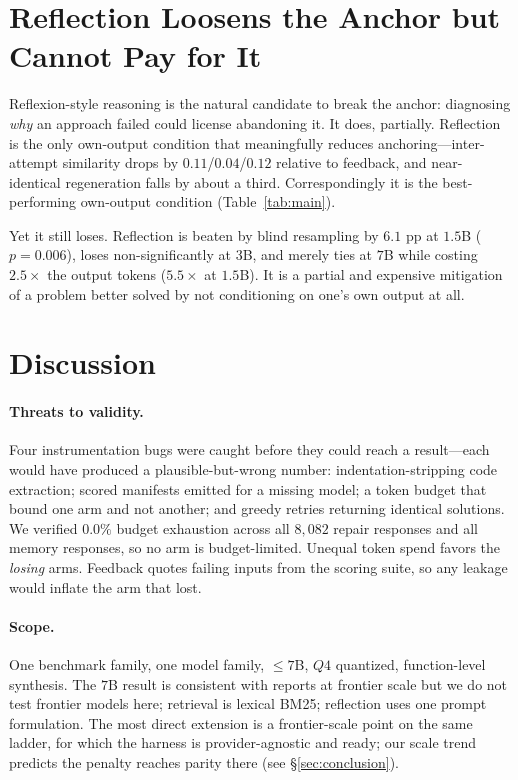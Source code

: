 \documentclass{article}
\begin{document}
\section{Reflection Loosens the Anchor but Cannot Pay for It}
\label{sec:reflect}

Reflexion-style reasoning \citep{shinn2023reflexion} is the natural candidate
to break the anchor: diagnosing \emph{why} an approach failed could license
abandoning it. It does, partially. Reflection is the only own-output condition
that meaningfully reduces anchoring---inter-attempt similarity drops by
$0.11$/$0.04$/$0.12$ relative to feedback, and near-identical regeneration
falls by about a third. Correspondingly it is the best-performing own-output
condition (Table~\ref{tab:main}).

Yet it still loses. Reflection is beaten by blind resampling by $6.1$ pp at
$1.5$B ($p{=}0.006$), loses non-significantly at $3$B, and merely ties at $7$B
while costing $2.5\times$ the output tokens ($5.5\times$ at $1.5$B). It is a
partial and expensive mitigation of a problem better solved by not conditioning
on one's own output at all.

\section{Discussion}
\label{sec:discussion}

\paragraph{Threats to validity.}
Four instrumentation bugs were caught before they could reach a result---each
would have produced a plausible-but-wrong number: indentation-stripping code
extraction; scored manifests emitted for a missing model; a token budget that
bound one arm and not another; and greedy retries returning identical
solutions. We verified $0.0\%$ budget exhaustion across all $8{,}082$ repair
responses and all memory responses, so no arm is budget-limited. Unequal token
spend favors the \emph{losing} arms. Feedback quotes failing inputs from the
scoring suite, so any leakage would inflate the arm that lost.

\paragraph{Scope.}
One benchmark family, one model family, $\le 7$B, $Q4$ quantized, function-level
synthesis. The $7$B result is consistent with reports at frontier scale but we
do not test frontier models here; retrieval is lexical BM25; reflection uses
one prompt formulation. The most direct extension is a frontier-scale point on
the same ladder, for which the harness is provider-agnostic and ready; our
scale trend predicts the penalty reaches parity there (see
\S\ref{sec:conclusion}).
\end{document}

